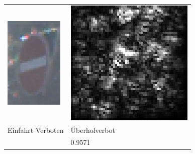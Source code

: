 \begin{table}
\begin{tabular}{p{4.4cm}p{4.4cm}}
		\includegraphics[height=4.4cm]{Images/AnPe/06848} &\includegraphics[width=\linewidth]{Images/AnPe/06848_s_int}  \\
		Einfahrt Verboten & Überholverbot\\
		& 0.9571\\

\end{tabular}
\end{table}
